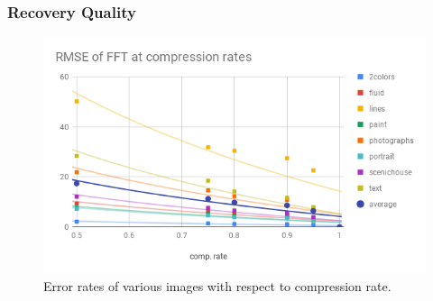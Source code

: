 	\subsubsection{Recovery Quality}
		\begin{figure}[h]
			\includegraphics[width=\linewidth]{images/compression-accuracy.png}
			\caption{Error rates of various images with respect to compression rate.}
			\label{fig:rmse-accuracy}
		\end{figure}

